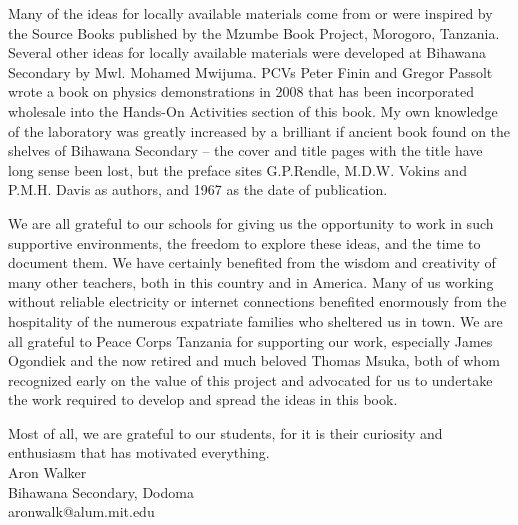 Many of the ideas for locally available materials 
come from or were inspired by the Source Books 
published by the Mzumbe Book Project, Morogoro, Tanzania. 
Several other ideas for locally available materials 
were developed at Bihawana Secondary by Mwl. Mohamed Mwijuma. 
PCVs Peter Finin and Gregor Passolt wrote 
a book on physics demonstrations in 2008 
that has been incorporated wholesale 
into the Hands-On Activities section of this book. 
My own knowledge of the laboratory was greatly increased 
by a brilliant if ancient book found on the shelves of Bihawana Secondary -- 
the cover and title pages with the title have long sense been lost, 
but the preface sites G.P.Rendle, M.D.W. Vokins and P.M.H. Davis as authors, 
and 1967 as the date of publication.

We are all grateful to our schools 
for giving us the opportunity to work in such supportive environments, 
the freedom to explore these ideas, 
and the time to document them. 
We have certainly benefited from the wisdom 
and creativity of many other teachers, 
both in this country and in America. 
Many of us working without reliable electricity 
or internet connections benefited enormously 
from the hospitality of the numerous expatriate families 
who sheltered us in town. 
We are all grateful to Peace Corps Tanzania for supporting our work, 
especially James Ogondiek and the now retired and much beloved Thomas Msuka, 
both of whom recognized early on the value of this project 
and advocated for us to undertake the work required to develop 
and spread the ideas in this book.

Most of all, we are grateful to our students, 
for it is their curiosity and enthusiasm that has motivated everything.\\[24pt]
Aron Walker\\
Bihawana Secondary, Dodoma\\
aronwalk@alum.mit.edu
